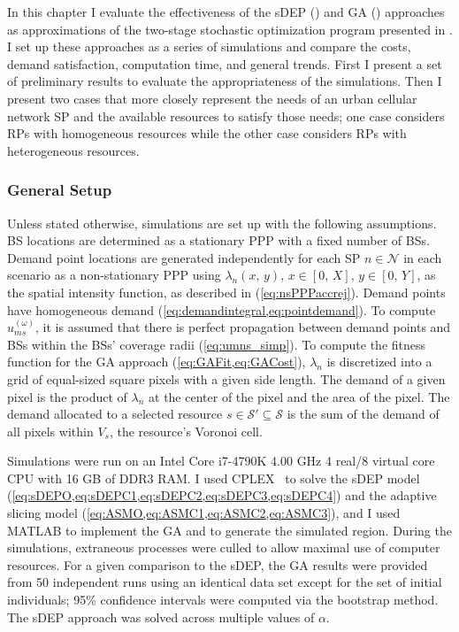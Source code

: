 \documentclass[12pt,dvipsnames]{report}
\begin{document}
In this chapter I evaluate the effectiveness of the sDEP () and GA () approaches as approximations of the two-stage stochastic optimization program presented in .  I set up these approaches as a series of simulations and compare the costs, demand satisfaction, computation time, and general trends.  First I present a set of preliminary results to evaluate the appropriateness of the simulations.  Then I present two cases that more closely represent the needs of an urban cellular network SP and the available resources to satisfy those needs; one case considers RPs with homogeneous resources while the other case considers RPs with heterogeneous resources.

\subsubsection{General Setup}

Unless stated otherwise, simulations are set up with the following assumptions.  BS locations are determined as a stationary PPP with a fixed number of BSs.  Demand point locations are generated independently for each SP $n \in \mathcal{N}$ in each scenario as a non-stationary PPP using $\lambda_n\left( x,\, y \right),\, x \in \left[ 0,\, X \right],\, y \in \left[ 0,\, Y \right]$, as the spatial intensity function, as described in  (\cref{eq:nsPPPaccrej}).  Demand points have homogeneous demand (\cref{eq:demandintegral,eq:pointdemand}).  To compute $u_{ms}^{\left( \omega \right)}$, it is assumed that there is perfect propagation between demand points and BSs within the BSs' coverage radii (\cref{eq:umns_simp}).  To compute the fitness function for the GA approach (\cref{eq:GAFit,eq:GACost}), $\lambda_n$ is discretized into a grid of equal-sized square pixels with a given side length.  The demand of a given pixel is the product of $\lambda_n$ at the center of the pixel and the area of the pixel.  The demand allocated to a selected resource $s \in \mathcal{S}' \subseteq \mathcal{S}$ is the sum of the demand of all pixels within $V_s$, the resource's Voronoi cell.

Simulations were run on an Intel Core i7-4790K 4.00 GHz 4 real/8 virtual core CPU with 16 GB of DDR3 RAM.  I used CPLEX~\cite{Cplex} to solve the sDEP model (\cref{eq:sDEPO,eq:sDEPC1,eq:sDEPC2,eq:sDEPC3,eq:sDEPC4}) and the adaptive slicing model (\cref{eq:ASMO,eq:ASMC1,eq:ASMC2,eq:ASMC3}), and I used MATLAB to implement the GA and to generate the simulated region.  During the simulations, extraneous processes were culled to allow maximal use of computer resources.  For a given comparison to the sDEP, the GA results were provided from 50 independent runs using an identical data set except for the set of initial individuals; 95\% confidence intervals were computed via the bootstrap method.  The sDEP approach was solved across multiple values of $\alpha$.
\end{document}
